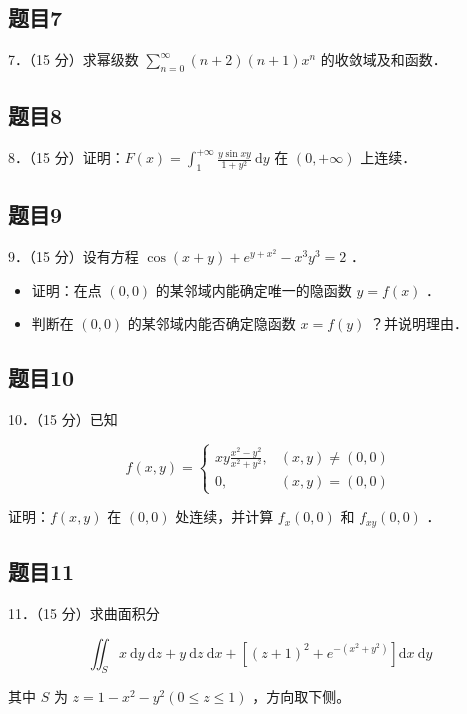 \documentclass{article}
\begin{document}
\subsection{题目7}
7．（15 分）求幂级数 \(\sum_{n=0}^{\infty}(n+2)(n+1) x^{n}\) 的收敛域及和函数．

\subsection{题目8}
8．（15 分）证明：\(F(x)=\int_{1}^{+\infty} \frac{y \sin x y}{1+y^{2}} \mathrm{~d} y\) 在 \((0,+\infty)\) 上连续．

\subsection{题目9}
9．（15 分）设有方程 \(\cos (x+y)+e^{y+x^{2}}-x^{3} y^{3}=2\) ．

\begin{itemize}
  \item[（1）] 证明：在点 \((0,0)\) 的某邻域内能确定唯一的隐函数 \(y=f(x)\) ．
  \item[（2）] 判断在 \((0,0)\) 的某邻域内能否确定隐函数 \(x=f(y)\) ？并说明理由．
\end{itemize}

\subsection{题目10}
10．（15 分）已知

\[
f(x, y)= \begin{cases}x y \frac{x^{2}-y^{2}}{x^{2}+y^{2}}, & (x, y) \neq(0,0) \\ 0, & (x, y)=(0,0)\end{cases}
\]

证明：\(f(x, y)\) 在 \((0,0)\) 处连续，并计算 \(f_{x}(0,0)\) 和 \(f_{x y}(0,0)\) ．

\subsection{题目11}
11．（15 分）求曲面积分

\[
\iint_{S} x \mathrm{~d} y \mathrm{~d} z+y \mathrm{~d} z \mathrm{~d} x+\left[(z+1)^{2}+e^{-\left(x^{2}+y^{2}\right)}\right] \mathrm{d} x \mathrm{~d} y
\]

其中 \(S\) 为 \(z=1-x^{2}-y^{2}(0 \leq z \leq 1)\) ，方向取下侧。
\end{document}
